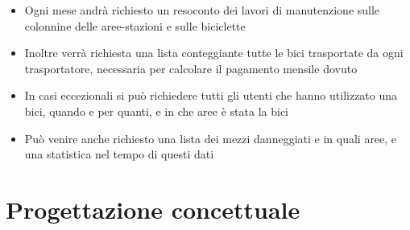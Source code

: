 \documentclass[a4paper,twoside]{article}
\begin{document}
\begin{itemize}
 \item Ogni mese andrà richiesto un resoconto dei lavori di manutenzione sulle colonnine delle aree-stazioni e sulle biciclette
 \item Inoltre verrà richiesta una lista conteggiante tutte le bici trasportate da ogni trasportatore, necessaria per calcolare il pagamento mensile dovuto
 \item In casi eccezionali si può richiedere tutti gli utenti che hanno utilizzato una bici, quando e per quanti, e in che aree è stata la bici
 \item Può venire anche richiesto una lista dei mezzi danneggiati e in quali aree, e una statistica nel tempo di questi dati
\end{itemize}

\section{Progettazione concettuale}

\end{document}
